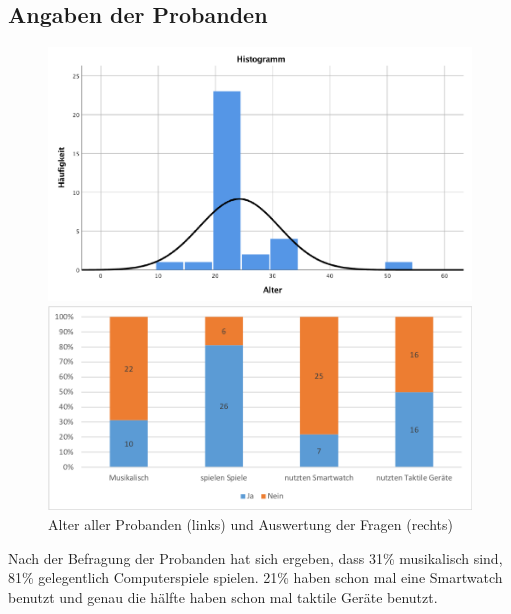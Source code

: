 
\subsection{Angaben der Probanden}

\begin{figure}[htbp] 
	\centering
	\begin{minipage}[t]{0.4\textwidth}
		\includegraphics[width=\textwidth]{pics/analyse/person/alter.png}
	\end{minipage}
	\begin{minipage}[t]{0.4\textwidth}
		\includegraphics[width=\textwidth]{pics/analyse/person/questions.png}
	\end{minipage}
	\caption{Alter aller Probanden (links) und Auswertung der Fragen (rechts)}
	\label{fig:AngabenZurPerson}
\end{figure}

Nach der Befragung der Probanden hat sich ergeben, dass 31\% musikalisch sind, 81\% gelegentlich Computerspiele spielen. 21\% haben schon mal eine Smartwatch benutzt und genau die h{\"a}lfte haben schon mal taktile Ger{\"a}te benutzt.

